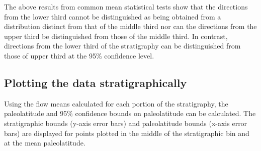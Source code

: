 \documentclass[letterpaper,10pt,english]{/Users/polarwander/Library/Enthought/Canopy_64bit/User/lib/python2.7/site-packages/sphinx/texinputs/sphinxhowto}
\begin{document}
        
    
The above results from common mean statistical tests show that the
directions from the lower third cannot be distinguished as being
obtained from a distribution distinct from that of the middle third nor
can the directions from the upper third be distinguished from those of
the middle third. In contrast, directions from the lower third of the
stratigraphy can be distinguished from those of upper third at the 95\%
confidence level.\subsection{Plotting the data stratigraphically}Using the flow means calculated for each portion of the stratigraphy,
the paleolatitude and 95\% confidence bounds on paleolatitude can be
calculated. The stratigraphic bounds (y-axis error bars) and
paleolatitude bounds (x-axis error bars) are displayed for points
plotted in the middle of the stratigraphic bin and at the mean
paleolatitude.

\end{document}
